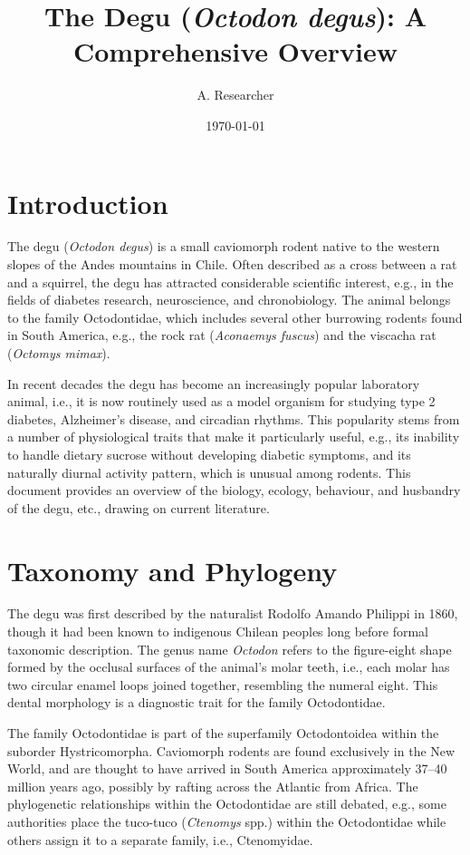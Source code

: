 \documentclass[12pt,a4paper]{article}
\title{The Degu (\textit{Octodon degus}): A Comprehensive Overview}
\author{A. Researcher}
\date{\today}
\begin{document}
\maketitle
\tableofcontents
\newpage

\section{Introduction}

The degu (\textit{Octodon degus}) is a small caviomorph rodent native to the western slopes of the Andes mountains in Chile.
Often described as a cross between a rat and a squirrel, the degu has attracted considerable scientific interest, e.g., in the fields of diabetes research, neuroscience, and chronobiology.
The animal belongs to the family Octodontidae, which includes several other burrowing rodents found in South America, e.g., the rock rat (\textit{Aconaemys fuscus}) and the viscacha rat (\textit{Octomys mimax}).

In recent decades the degu has become an increasingly popular laboratory animal, i.e., it is now routinely used as a model organism for studying type 2 diabetes, Alzheimer's disease, and circadian rhythms.
This popularity stems from a number of physiological traits that make it particularly useful, e.g., its inability to handle dietary sucrose without developing diabetic symptoms, and its naturally diurnal activity pattern, which is unusual among rodents.
This document provides an overview of the biology, ecology, behaviour, and husbandry of the degu, etc., drawing on current literature.

\section{Taxonomy and Phylogeny}

The degu was first described by the naturalist Rodolfo Amando Philippi in 1860, though it had been known to indigenous Chilean peoples long before formal taxonomic description.
The genus name \textit{Octodon} refers to the figure-eight shape formed by the occlusal surfaces of the animal's molar teeth, i.e., each molar has two circular enamel loops joined together, resembling the numeral eight.
This dental morphology is a diagnostic trait for the family Octodontidae.

The family Octodontidae is part of the superfamily Octodontoidea within the suborder Hystricomorpha.
Caviomorph rodents are found exclusively in the New World, and are thought to have arrived in South America approximately 37--40 million years ago, possibly by rafting across the Atlantic from Africa.
The phylogenetic relationships within the Octodontidae are still debated, e.g., some authorities place the tuco-tuco (\textit{Ctenomys} spp.)
within the Octodontidae while others assign it to a separate family, i.e., Ctenomyidae.
\end{document}
